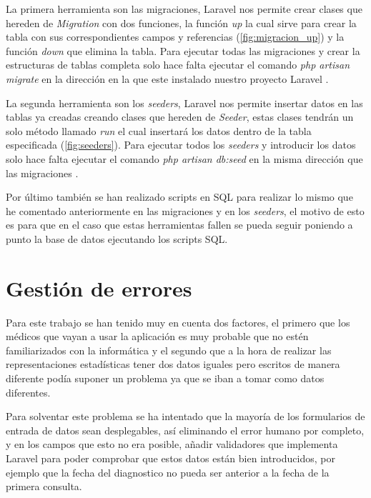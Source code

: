 La primera herramienta son las migraciones, Laravel nos permite crear clases que hereden de \textit{Migration} con dos funciones, la función \textit{up} la cual sirve para crear la tabla con sus correspondientes campos y referencias (\ref{fig:migracion_up}) y la función \textit{down} que elimina la tabla. Para ejecutar todas las migraciones y crear la estructuras de tablas completa solo hace falta ejecutar el comando \textit{php artisan migrate} en la dirección en la que este instalado nuestro proyecto Laravel \cite{migraciones}.


La segunda herramienta son los \textit{seeders}, Laravel nos permite insertar datos en las tablas ya creadas creando clases que hereden de \textit{Seeder}, estas clases tendrán un solo método llamado \textit{run} el cual insertará los datos dentro de la tabla especificada (\ref{fig:seeders}). Para ejecutar todos los \textit{seeders} y introducir los datos solo hace falta ejecutar el comando \textit{php artisan db:seed}  en la misma dirección que las migraciones \cite{seeders}. 


Por último también se han realizado scripts en SQL para realizar lo mismo que he comentado anteriormente en las migraciones y en los \textit{seeders}, el motivo de esto es para que en el caso que estas herramientas fallen se pueda seguir poniendo a punto la base de datos ejecutando los scripts SQL.

\section{Gestión de errores}

Para este trabajo se han tenido muy en cuenta dos factores, el primero que los médicos que vayan a usar la aplicación es muy probable que no estén familiarizados con la informática y el segundo que a la hora de realizar las representaciones estadísticas tener dos datos iguales pero escritos de manera diferente podía suponer un problema ya que se iban a tomar como datos diferentes.

Para solventar este problema se ha intentado que la mayoría de los formularios de entrada de datos sean desplegables, así eliminando el error humano por completo, y en los campos que esto no era posible, añadir validadores que implementa Laravel para poder comprobar que estos datos están bien introducidos, por ejemplo que la fecha del diagnostico no pueda ser anterior a la fecha de la primera consulta. 

